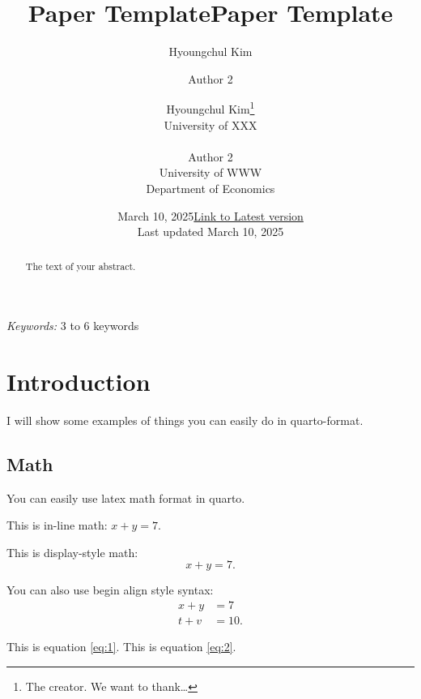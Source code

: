 \documentclass[
  11pt]{article}
\title{Paper Template}
\author{Hyoungchul Kim \and Author 2}
\date{March 10, 2025}
\begin{document}
\def\spacingset#1{\renewcommand{\baselinestretch}%
{#1}\small\normalsize} \spacingset{1}



\date{\href{https://hchulkim.github.io}{Link to Latest version}\\ \vspace{1em} Last updated March
10, 2025}
\title{Paper Template}
\author{
Hyoungchul Kim\thanks{The creator. We want to thank\ldots{}}\\
University of XXX\\
\\Author 2\\
University of WWW\\
Department of Economics\\
}
\maketitle

\bigskip
\bigskip
\begin{abstract}
The text of your abstract.
\end{abstract}

\noindent%
{\it Keywords:} 3 to 6 keywords
\vfill

\newpage
\spacingset{1.2} %

\section{Introduction}\label{sec-intro}

I will show some examples of things you can easily do in quarto-format.

\subsection{Math}\label{math}

You can easily use latex math format in quarto.

This is in-line math: \(x + y = 7\).

This is display-style math: \[x + y = 7.\]

You can also use begin align style syntax: \begin{align}
  x + y &= 7\label{eq:1}\\
  t + v &= 10.\label{eq:2}
\end{align}

This is equation \ref{eq:1}. This is equation \ref{eq:2}.
\end{document}
